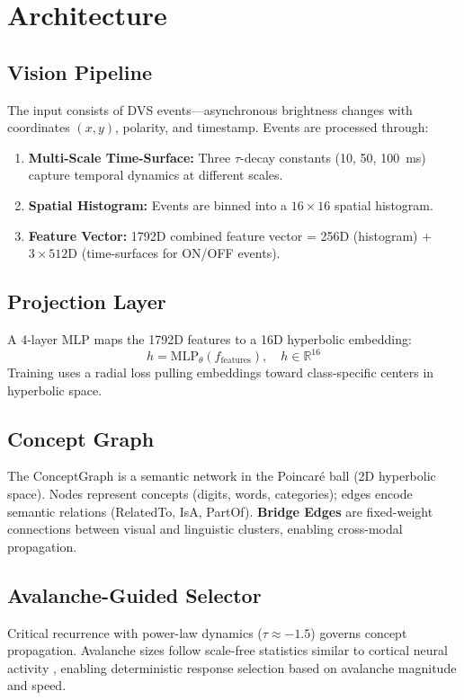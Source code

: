 \documentclass[conference]{IEEEtran}
\begin{document}
\section{Architecture}

\subsection{Vision Pipeline}
The input consists of DVS events---asynchronous brightness changes with coordinates $(x, y)$, polarity, and timestamp. Events are processed through:
\begin{enumerate}
    \item \textbf{Multi-Scale Time-Surface:} Three $\tau$-decay constants (10, 50, 100~ms) capture temporal dynamics at different scales.
    \item \textbf{Spatial Histogram:} Events are binned into a $16 \times 16$ spatial histogram.
    \item \textbf{Feature Vector:} 1792D combined feature vector = 256D (histogram) + $3 \times 512$D (time-surfaces for ON/OFF events).
\end{enumerate}

\subsection{Projection Layer}
A 4-layer MLP maps the 1792D features to a 16D hyperbolic embedding:
\begin{equation}
    h = \text{MLP}_{\theta}(f_{\text{features}}), \quad h \in \mathbb{R}^{16}
\end{equation}
Training uses a radial loss pulling embeddings toward class-specific centers in hyperbolic space.

\subsection{Concept Graph}
The ConceptGraph is a semantic network in the Poincaré ball (2D hyperbolic space). Nodes represent concepts (digits, words, categories); edges encode semantic relations (RelatedTo, IsA, PartOf). \textbf{Bridge Edges} are fixed-weight connections between visual and linguistic clusters, enabling cross-modal propagation.

\subsection{Avalanche-Guided Selector}
Critical recurrence with power-law dynamics ($\tau \approx -1.5$) governs concept propagation. Avalanche sizes follow scale-free statistics similar to cortical neural activity \cite{criticality_snn}, enabling deterministic response selection based on avalanche magnitude and speed.
\end{document}
